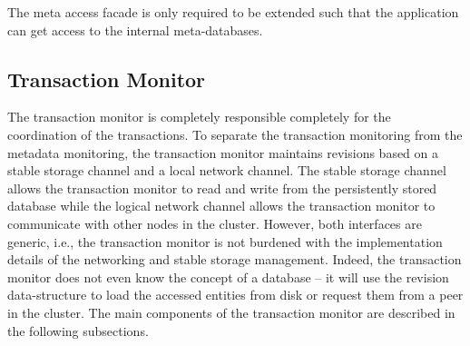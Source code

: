 \documentclass[a4paper, 10pt]{book}
\begin{document}
\begin{description}
                                        The meta access facade is only required to be extended such that the
                                        application can get access to the internal meta-databases.
                                \end{description}


                                \subsection{Transaction Monitor}
                                \label{sec:transaction-monitor}

                                The transaction monitor is completely responsible completely for the
                                coordination of the transactions.
                                To separate the transaction monitoring from the metadata monitoring,
                                the transaction monitor maintains revisions based on a stable
                                storage channel and a local network channel. 
                                The stable storage channel allows the transaction monitor to read and
                                write from the persistently stored database while the logical network
                                channel allows the transaction monitor to communicate with other nodes
                                in the cluster. 
                                However, both interfaces are generic, i.e., the transaction monitor is
                                not burdened with the implementation details of the networking and
                                stable storage management. Indeed, the transaction monitor does not
                                even know the concept of a database -- it will use the revision
                                data-structure to load the accessed entities from disk or request them
                                from a peer in the cluster.
                                The main components of the transaction monitor are described in the
                                following subsections.
\end{document}
